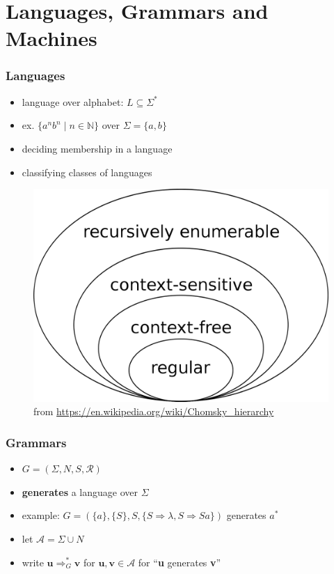 \documentclass{beamer}
\begin{document}
\section{Languages, Grammars and Machines}

\begin{frame}
\frametitle{Languages}
\begin{itemize}
  \item language over alphabet: $L \subseteq \Sigma^*$
  \item ex. $\{a^nb^n \mid n \in \mathbb{N}\}$ over $\Sigma = \{a, b\}$
  \item deciding membership in a language
  \item classifying classes of languages
\end{itemize}
\begin{figure}
  \includegraphics[height=0.4\textwidth]{Chomsky-hierarchy.png}
  \caption{from \url{https://en.wikipedia.org/wiki/Chomsky_hierarchy}}
\end{figure}
\end{frame}


\begin{frame}
\frametitle{Grammars}
\begin{itemize}
  \item $G = (\Sigma, N, S, \mathcal{R})$
  \item \textbf{generates} a language over $\Sigma$
  \item example: $G = (\{a\}, \{S\}, S, \{S \Rightarrow \lambda, S \Rightarrow
    Sa\})$ generates $a^*$
  \item let $\mathcal{A} = \Sigma \cup N$
  \item write $\mathbf{u} \Rightarrow_{G}^* \mathbf{v}$ for $\mathbf{u, v} \in
    \mathcal{A}$ for ``\textbf{u} generates \textbf{v}''
\end{itemize}
\end{frame}
\end{document}
